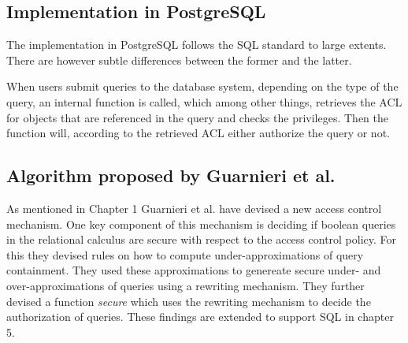 \subsection{Implementation in PostgreSQL}

The implementation in PostgreSQL follows the SQL standard to large extents. 
%
There are however subtle differences between the former and the latter.
%

When users submit queries to the database system, depending on the type of the query, an internal function is called, which among other things, retrieves the ACL for objects that are referenced in the query and checks the privileges.
%
Then the function will, according to the retrieved ACL either authorize the query or not.

\subsection{Algorithm proposed by Guarnieri et al.}

As mentioned in Chapter 1 Guarnieri et al. have devised a new access control mechanism.
%
One key component of this mechanism is deciding if boolean queries in the relational calculus are secure with respect to the access control policy.
%
For this they devised rules on how to compute under-approximations of query containment.
%
They used these approximations to genereate secure under- and over-approximations of queries using a rewriting mechanism.
%
They further devised a function \emph{secure} which uses the rewriting mechanism to decide the authorization of queries.
%
These findings are extended to support SQL in chapter 5.